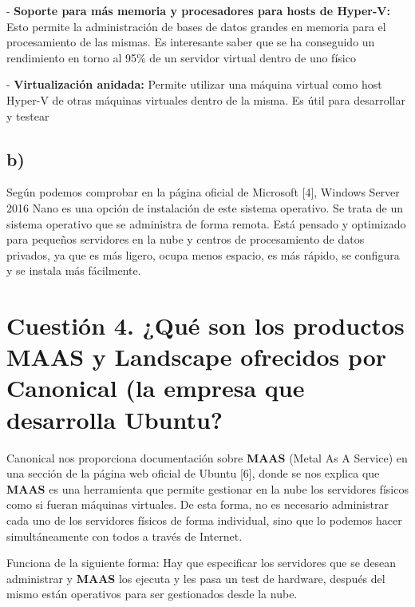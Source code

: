 - \textbf{Soporte para más memoria y procesadores para hosts de Hyper-V:} Esto permite la administración de bases de datos grandes en memoria para el procesamiento de las mismas. Es interesante saber que se ha conseguido un rendimiento en torno al 95\% de un servidor virtual dentro de uno físico

- \textbf{Virtualización anidada:} Permite utilizar una máquina virtual como host Hyper-V de otras máquinas virtuales dentro de la misma. Es útil para desarrollar y testear

\subsection{b)}

Según podemos comprobar en la página oficial de Microsoft [4], Windows  Server 2016 Nano es una opción de instalación de este sistema operativo. Se trata de un sistema operativo que se administra de forma remota. Está pensado y optimizado para pequeños servidores en la nube y centros de procesamiento de datos privados, ya que es más ligero, ocupa menos espacio, es más rápido, se configura y se instala más fácilmente.




\section{Cuestión 4. ¿Qué son los productos MAAS y Landscape ofrecidos por Canonical (la empresa que desarrolla Ubuntu?}

Canonical nos proporciona documentación sobre \textbf{MAAS} (Metal As A Service) en una sección de la página web oficial de Ubuntu [6], donde se nos explica que \textbf{MAAS} es una herramienta que permite gestionar en la nube los servidores físicos como si fueran máquinas virtuales. De esta forma, no es necesario administrar cada uno de los servidores físicos de forma individual, sino que lo podemos hacer simultáneamente con todos a través de Internet.

Funciona de la siguiente forma: Hay que especificar los servidores que se desean administrar y \textbf{MAAS} los ejecuta y les pasa un test de hardware, después del mismo están operativos para ser gestionados desde la nube.\newline

